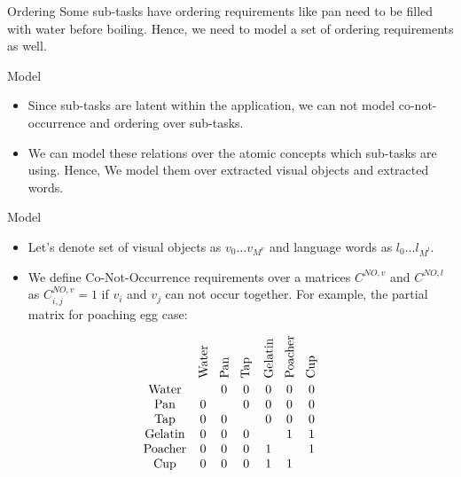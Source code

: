 \begin{frame}{Ordering}
Some sub-tasks have ordering requirements like pan need to be filled with water before boiling. Hence, we need to model a set of ordering requirements as well.
\end{frame}

\begin{frame}{Model}
\begin{itemize}
\item Since sub-tasks are latent within the application, we can not model co-not-occurrence and ordering over sub-tasks. 
\item We can model these relations over the atomic concepts which sub-tasks are using. Hence, We model them over extracted visual objects and extracted words.
\end{itemize}
\end{frame}


\begin{frame}{Model}
\begin{itemize}
\item Let's denote set of visual objects as $v_0 \ldots v_{M^v}$ and language words as $l_0 \ldots l_{M^l}$.
\item We define Co-Not-Occurrence requirements over a matrices $C^{NO,v}$ and $C^{NO,l}$ as $C^{NO,v}_{i,j} =1$ if $v_i$ and $v_j$ can not occur together. For example, the partial matrix for poaching egg case:
\end{itemize}
\[
 \begin{array}{ccccccc} 
&\rotatebox{90}{Water} & \rotatebox{90}{Pan} & \rotatebox{90}{Tap} & \rotatebox{90}{Gelatin} & \rotatebox{90}{Poacher} & \rotatebox{90}{Cup} \\ 
\text{Water} &  & 0 & 0 & 0 & 0 & 0 \\
\text{Pan} & 0 &  & 0 & 0 & 0 & 0 \\
\text{Tap} & 0 & 0 &  & 0 & 0 & 0 \\
\text{Gelatin} & 0 & 0 & 0 &  & 1 & 1 \\
\text{Poacher} & 0 & 0 & 0 & 1 &  & 1 \\
\text{Cup} & 0 & 0 & 0 & 1 & 1 & 
\end{array} 
\]
\end{frame}

